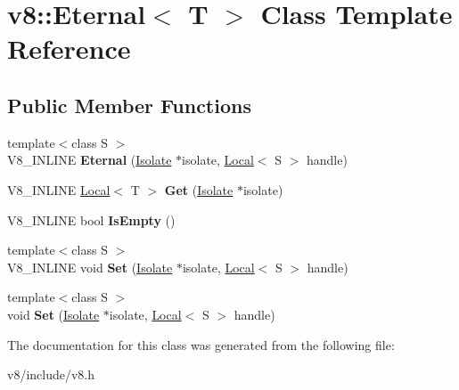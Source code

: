 \hypertarget{classv8_1_1Eternal}{}\section{v8\+:\+:Eternal$<$ T $>$ Class Template Reference}
\label{classv8_1_1Eternal}
\subsection*{Public Member Functions}
\begin{DoxyCompactItemize}
\item 
\hypertarget{classv8_1_1Eternal_ad7522d8b51e072dcbc4261bc1f155bcb}{}{\footnotesize template$<$class S $>$ }\\V8\+\_\+\+I\+N\+L\+I\+N\+E {\bfseries Eternal} (\hyperlink{classv8_1_1Isolate}{Isolate} $\ast$isolate, \hyperlink{classv8_1_1Local}{Local}$<$ S $>$ handle)\label{classv8_1_1Eternal_ad7522d8b51e072dcbc4261bc1f155bcb}

\item 
\hypertarget{classv8_1_1Eternal_ae9614309d9c93fe484d81926e31ed6b7}{}V8\+\_\+\+I\+N\+L\+I\+N\+E \hyperlink{classv8_1_1Local}{Local}$<$ T $>$ {\bfseries Get} (\hyperlink{classv8_1_1Isolate}{Isolate} $\ast$isolate)\label{classv8_1_1Eternal_ae9614309d9c93fe484d81926e31ed6b7}

\item 
\hypertarget{classv8_1_1Eternal_a5d77cbfe0662af5fe75172be9a8f1d5d}{}V8\+\_\+\+I\+N\+L\+I\+N\+E bool {\bfseries Is\+Empty} ()\label{classv8_1_1Eternal_a5d77cbfe0662af5fe75172be9a8f1d5d}

\item 
\hypertarget{classv8_1_1Eternal_a75a32f5c428a0d47e13f66dbdeb9adba}{}{\footnotesize template$<$class S $>$ }\\V8\+\_\+\+I\+N\+L\+I\+N\+E void {\bfseries Set} (\hyperlink{classv8_1_1Isolate}{Isolate} $\ast$isolate, \hyperlink{classv8_1_1Local}{Local}$<$ S $>$ handle)\label{classv8_1_1Eternal_a75a32f5c428a0d47e13f66dbdeb9adba}

\item 
\hypertarget{classv8_1_1Eternal_a2f9dcec02b2c2f7d4b55aee0d8b9881a}{}{\footnotesize template$<$class S $>$ }\\void {\bfseries Set} (\hyperlink{classv8_1_1Isolate}{Isolate} $\ast$isolate, \hyperlink{classv8_1_1Local}{Local}$<$ S $>$ handle)\label{classv8_1_1Eternal_a2f9dcec02b2c2f7d4b55aee0d8b9881a}

\end{DoxyCompactItemize}


The documentation for this class was generated from the following file\+:\begin{DoxyCompactItemize}
\item 
v8/include/v8.\+h\end{DoxyCompactItemize}
